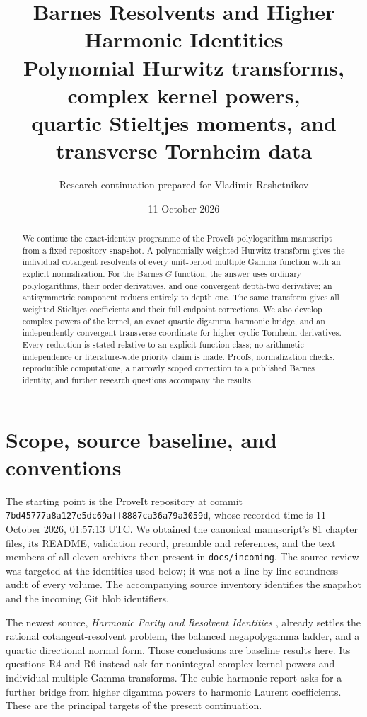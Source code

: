 \documentclass[11pt]{article}
\title{\textcolor{inkblue}{Barnes Resolvents and Higher Harmonic Identities}\\[8pt]
\large Polynomial Hurwitz transforms, complex kernel powers,\\
quartic Stieltjes moments, and transverse Tornheim data}
\author{Research continuation prepared for Vladimir Reshetnikov}
\date{11 October 2026}
\numberwithin{equation}{section}
\theoremstyle{plain}
\theoremstyle{definition}
\theoremstyle{remark}
\newcommand{\src}[1]{\nolinkurl{#1}}
\newcommand{\snapshot}{\nolinkurl{7bd45777a8a127e5dc69aff8887ca36a79a3059d}}
\begin{document}
\maketitle
\begin{abstract}
We continue the exact-identity programme of the ProveIt polylogarithm
manuscript from a fixed repository snapshot. A polynomially weighted
Hurwitz transform gives the individual cotangent resolvents of every
unit-period multiple Gamma function with an explicit normalization.
For the Barnes $G$ function, the answer uses ordinary polylogarithms,
their order derivatives, and one convergent depth-two derivative; an
antisymmetric component reduces entirely to depth one. The same
transform gives all weighted Stieltjes coefficients and their full
endpoint corrections. We also develop complex powers of the kernel,
an exact quartic digamma--harmonic bridge, and an independently
convergent transverse coordinate for higher cyclic Tornheim
derivatives. Every reduction is stated relative to an explicit
function class; no arithmetic independence or literature-wide
priority claim is made. Proofs, normalization checks, reproducible
computations, a narrowly scoped correction to a published Barnes
identity, and further research questions accompany the results.
\end{abstract}
\tableofcontents
\newpage

\section{Scope, source baseline, and conventions}
\label{bhr:sec:scope}

The starting point is the ProveIt repository at commit
\snapshot, whose recorded time is 11 October 2026, 01:57:13 UTC.
We obtained the canonical manuscript's 81 chapter files, its README,
validation record, preamble and references, and the text members of all
eleven archives then present in \src{docs/incoming}. The source review
was targeted at the identities used below; it was not a line-by-line
soundness audit of every volume. The accompanying source inventory
identifies the snapshot and the incoming Git blob identifiers.

The newest source, \emph{Harmonic Parity and Resolvent Identities}
\cite{bhr:Parity}, already settles the rational cotangent-resolvent
problem, the balanced negapolygamma ladder, and a quartic directional
normal form. Those conclusions are baseline results here. Its
questions R4 and R6 instead ask for nonintegral complex kernel powers
and individual multiple Gamma transforms. The cubic harmonic report
\cite{bhr:Cubic} asks for a further bridge from higher digamma powers to
harmonic Laurent coefficients. These are the principal targets of
the present continuation.
\end{document}
